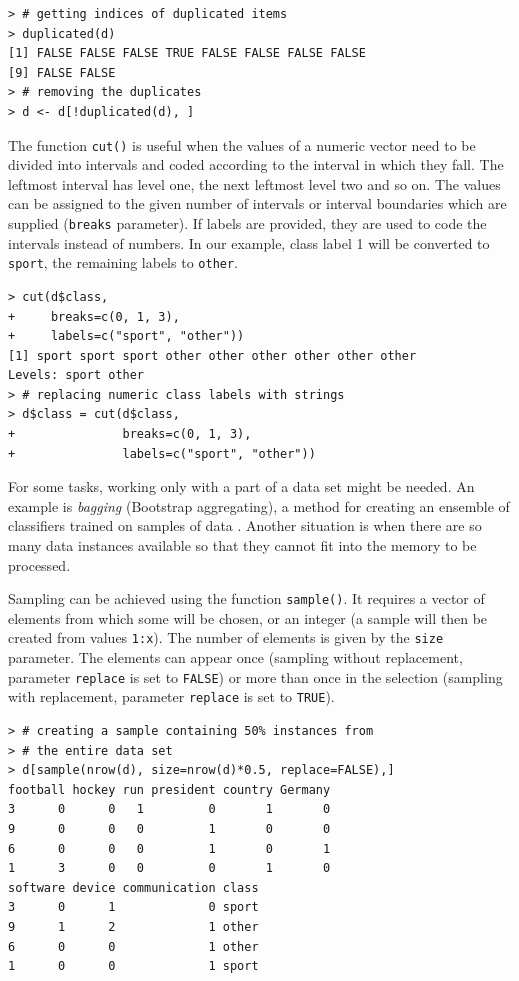 \begin{verbatim}
> # getting indices of duplicated items
> duplicated(d)
[1] FALSE FALSE FALSE TRUE FALSE FALSE FALSE FALSE
[9] FALSE FALSE
> # removing the duplicates
> d <- d[!duplicated(d), ]
\end{verbatim}

The function \texttt{cut()} is useful when the values of a numeric vector need to be
divided into intervals and coded according to the interval in which they fall. The
leftmost interval has level one, the next leftmost level two and so on. The values
can be assigned to the given number of intervals or interval boundaries which are
supplied (\texttt{breaks} parameter). If labels are provided, they are used to code the
intervals instead of numbers. In our example, class label 1 will be converted to
\texttt{sport}, the remaining labels to \texttt{other}.

\begin{verbatim}
> cut(d$class,
+     breaks=c(0, 1, 3),
+     labels=c("sport", "other"))
[1] sport sport sport other other other other other other
Levels: sport other
> # replacing numeric class labels with strings
> d$class = cut(d$class,
+               breaks=c(0, 1, 3),
+               labels=c("sport", "other"))
\end{verbatim}  

For some tasks, working only with a part of a data set might be needed. An
example is \textit{bagging} (Bootstrap aggregating), a method for creating an ensemble
of classifiers trained on samples of data \cite{ref32}. Another situation is when there are
so many data instances available so that they cannot fit into the memory to be
processed.

Sampling can be achieved using the function \texttt{sample()}. 
It requires a vector of elements from which some will be chosen, or an integer 
(a sample will then be created from values \texttt{1:x}). 
The number of elements is given by the \texttt{size} parameter. 
The elements can appear once (sampling without replacement, parameter 
\texttt{replace} is set to \texttt{FALSE}) or more than once in the selection 
(sampling with replacement, parameter \texttt{replace} is set to \texttt{TRUE}).

\begin{verbatim}
> # creating a sample containing 50% instances from
> # the entire data set
> d[sample(nrow(d), size=nrow(d)*0.5, replace=FALSE),]
football hockey run president country Germany
3      0      0   1         0       1       0
9      0      0   0         1       0       0
6      0      0   0         1       0       1
1      3      0   0         0       1       0
software device communication class
3      0      1             0 sport
9      1      2             1 other
6      0      0             1 other
1      0      0             1 sport
\end{verbatim}

